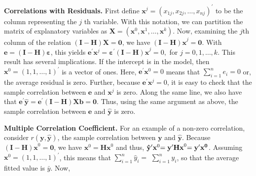 \textbf{Correlations with Residuals.} First define
$\mathbf{x}^j=(x_{1j},x_{2j},\dots,x_{nj})^{\prime}$ to be the
column representing the $j$ th variable. With this notation, we can
partition the matrix of explanatory variables as $\mathbf{X}=\left(
\mathbf{x}^{0},\mathbf{x}^{1},\dots,\mathbf{x}^{k} \right)$. Now,
examining the $j$th column of the relation $\mathbf{(I-H)X}=
\mathbf{0}$, we have $\mathbf{(I-H)x}^{j}=\mathbf{0}$. With
$\mathbf{e}=\mathbf{(I-H) \boldsymbol \varepsilon}$, this yields $
\mathbf{e}^{\prime}\mathbf{x}^{j}=\boldsymbol
\varepsilon^{\prime}\mathbf{(I-H)x} ^{j}=0,$ for $j=0,1,\ldots,k.$
This result has several implications. If the intercept is in the
model, then $\mathbf{x}^{0}=(1,1,\ldots,1)^{\prime}$ is a vector of
ones. Here, $\mathbf{e}^{\prime}\mathbf{x}^{0}=0$ means that
$\sum_{i=1}^{n} e_i=0$ or, the average residual is zero. Further,
because $\mathbf{e}^{\prime} \mathbf{x}^{j}=0$, it is easy to check
that the sample correlation between $\mathbf{e}$ and
$\mathbf{x}^{j}$ is zero. Along the same line, we also have that
$\mathbf{e}^{\prime}\mathbf{\hat{y}}=\mathbf{e}^{\prime}
\mathbf{(I-H)Xb}=\mathbf{0}$. Thus, using the same argument as
above, the sample correlation between $\mathbf{e}$ and
$\mathbf{\hat{y}}$ is zero.


\textbf{Multiple Correlation Coefficient.} For an example of a
non-zero correlation, consider $r(\mathbf{y,\hat{y}})$, the sample
correlation
between $\mathbf{y}$ and $\mathbf{\hat{y}}$. Because $\mathbf{(I-H)x}^{0}=%
\mathbf{0}$, we have $\mathbf{x}^{0}=\mathbf{Hx}^{0}$ and thus, $\mathbf{%
\hat{y}}^{\prime}\mathbf{x}^{0}\mathbf{=y}^{\prime}\mathbf{Hx}^{0}\mathbf{%
=y^{\prime} x^{0}}$. Assuming
$\mathbf{x}^{0}=(1,1,\ldots,1)^{\prime}$, this means that
$\sum_{i=1}^{n}\hat{y}_i=$ $\sum_{i=1}^{n}y_i$, so that the average
fitted value is $\bar{y}$. Now,


